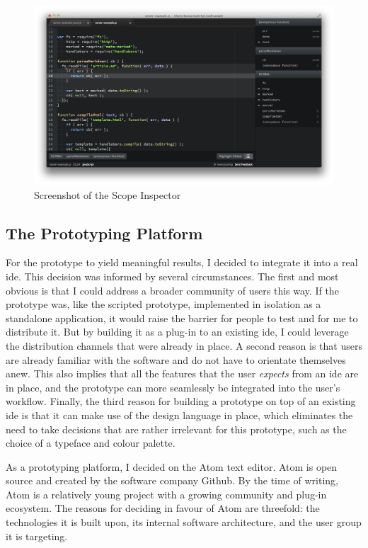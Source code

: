 \begin{figure}[H]
\centering
\includegraphics[keepaspectratio,width=1\textwidth]{img/scope-inspector.png}
\caption{Screenshot of the Scope Inspector}
\label{fig:scopeinspector}
\end{figure}

\subsection{The Prototyping Platform}\label{the-prototyping-platform}

For the prototype to yield meaningful results, I decided to integrate it
into a real \ac{ide}. This decision was informed by several
circumstances. The first and most obvious is that I could address a
broader community of users this way. If the prototype was, like the
scripted prototype, implemented in isolation as a standalone
application, it would raise the barrier for people to test and for me to
distribute it. But by building it as a plug-in to an existing \ac{ide},
I could leverage the distribution channels that were already in place. A
second reason is that users are already familiar with the software and
do not have to orientate themselves anew. This also implies that all the
features that the user \emph{expects} from an \ac{ide} are in place, and
the prototype can more seamlessly be integrated into the user’s
workflow. Finally, the third reason for building a prototype on top of
an existing \ac{ide} is that it can make use of the design language in
place, which eliminates the need to take decisions that are rather
irrelevant for this prototype, such as the choice of a typeface and
colour palette.

As a prototyping platform, I decided on the Atom text editor. Atom is
open source and created by the software company Github. By the time of
writing, Atom is a relatively young project with a growing community and
plug-in ecosystem. The reasons for deciding in favour of Atom are
threefold: the technologies it is built upon, its internal software
architecture, and the user group it is targeting.

